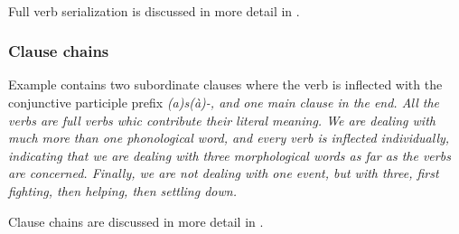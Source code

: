  \\
Full verb serialization is discussed in more detail in .

\subsubsection{Clause chains}\label{sec:wc:mvc:Clausechains}
Example  contains two subordinate clauses where the verb is inflected with the conjunctive participle prefix \em (a)s(à)-\em, and one main clause in the end. All the verbs are full verbs whic contribute their literal meaning. We are dealing with much more than one phonological word, and every verb is inflected individually, indicating that we are dealing with three morphological words as far as the verbs are concerned. Finally, we are not dealing with one event, but with three, first fighting, then helping, then settling down.


Clause chains are discussed in more detail in . 



